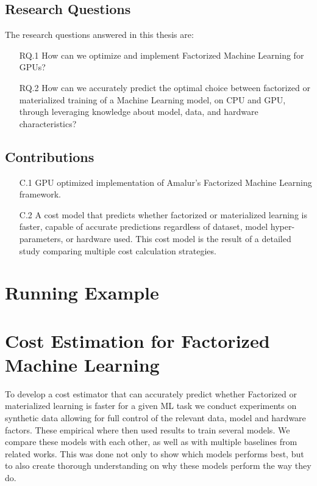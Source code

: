\subsection{Research Questions}
The research questions answered in this thesis are:
\begin{itemize}
    \item[RQ.1] How can we optimize and implement Factorized Machine Learning for GPUs?
    \item[RQ.2] How can we accurately predict the optimal choice between factorized or materialized training of a Machine Learning model, on CPU and GPU, through leveraging knowledge about model, data, and hardware characteristics?
\end{itemize}

\subsection{Contributions}
\begin{enumerate}
    \item[C.1] GPU optimized implementation of Amalur's Factorized Machine Learning framework.
    \item[C.2] A cost model that predicts whether factorized or materialized learning is faster, capable of accurate predictions regardless of dataset, model hyper-parameters, or hardware used. This cost model is the result of a detailed study comparing multiple cost calculation strategies.
\end{enumerate}

\section{Running Example}

\section{Cost Estimation for Factorized Machine Learning}
To develop a cost estimator that can accurately predict whether Factorized or materialized learning is faster for a given ML task we conduct experiments on synthetic data allowing for full control of the relevant data, model and hardware factors. These empirical where then used results to train several models. We compare these models with each other, as well as with multiple baselines from related works. This was done not only to show which models performs best, but to also create thorough understanding on why these models perform the way they do.

